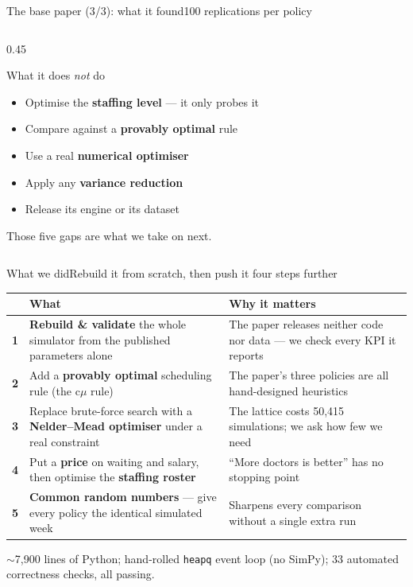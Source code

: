 \documentclass[aspectratio=169,11pt]{beamer}
\newcommand{\hl}[1]{\textcolor{deep}{\textbf{#1}}}
\begin{document}
\begin{frame}{The base paper \textnormal{(3/3)}: what it found}{100 replications per policy}
\begin{columns}[T,onlytextwidth]
\begin{column}{0.45\textwidth}
\begin{block}{What it does \emph{not} do}
\scriptsize
\begin{itemize}\setlength\itemsep{0.12em}\setlength\parskip{0pt}
  \item Optimise the \textbf{staffing level} --- it only probes it
  \item Compare against a \textbf{provably optimal} rule
  \item Use a real \textbf{numerical optimiser}
  \item Apply any \textbf{variance reduction}
  \item Release its engine or its dataset
\end{itemize}
\end{block}
\vspace{-0.2em}
{\scriptsize\color{soft}\centering Those five gaps are what we take on next.\par}
\end{column}
\end{columns}
\end{frame}

\begin{frame}{What we did}{Rebuild it from scratch, then push it four steps further}
\vspace{-0.3em}
\begin{center}\small
\begin{tabular}{@{}rp{5.4cm}p{6.0cm}@{}}
\toprule
& \textbf{What} & \textbf{Why it matters} \\
\midrule
\textbf{1} & \hl{Rebuild \& validate} the whole simulator from the published
             parameters alone
           & The paper releases neither code nor data --- we check every KPI
             it reports \\[0.35em]
\textbf{2} & Add a \hl{provably optimal} scheduling rule (the c$\mu$ rule)
           & The paper's three policies are all hand-designed heuristics \\[0.35em]
\textbf{3} & Replace brute-force search with a \hl{Nelder--Mead optimiser}
             under a real constraint
           & The lattice costs 50,415 simulations; we ask how few we need \\[0.35em]
\textbf{4} & Put a \hl{price} on waiting and salary, then optimise the
             \hl{staffing roster}
           & ``More doctors is better'' has no stopping point \\[0.35em]
\textbf{5} & \hl{Common random numbers} --- give every policy the identical
             simulated week
           & Sharpens every comparison without a single extra run \\
\bottomrule
\end{tabular}
\end{center}
\vspace{0.5em}
{\footnotesize\color{soft}
$\sim$7,900 lines of Python; hand-rolled \texttt{heapq} event loop (no SimPy);
33 automated correctness checks, all passing.}
\end{frame}
\end{document}
